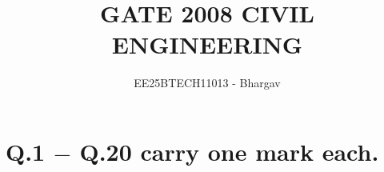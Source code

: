 \documentclass[journal]{IEEEtran}
\begin{document}




\title{GATE 2008 CIVIL ENGINEERING}
\author{EE25BTECH11013 - Bhargav}
\maketitle
{\let\newpage\relax\maketitle}

\renewcommand{\thefigure}{\theenumi}
\renewcommand{\thetable}{\theenumi}
\setlength{\intextsep}{10pt} %


\section*{Q.1 $-$ Q.20 carry one mark each.}
\end{document}
